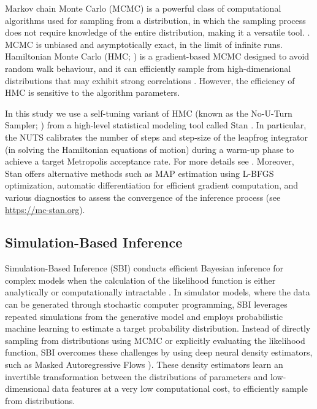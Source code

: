 \documentclass[preprint,11pt,authoryear]{elsarticle}
\begin{document}
Markov chain Monte Carlo (MCMC) is a powerful class of computational algorithms used for sampling from a distribution, in which the sampling process does not require knowledge of the entire distribution, making it a versatile tool. \citep{Andrieu2003, Murphy2022, Mcelreath2020}. MCMC is unbiased and asymptotically exact, in the limit of infinite runs. Hamiltonian Monte Carlo (HMC; \cite{Duane1987, Neal2010}) is a gradient-based MCMC designed to avoid random walk behaviour, and it can efficiently sample from high-dimensional distributions that may exhibit strong correlations \citep{Betancourt2017}. However, the efficiency of HMC is sensitive to the algorithm parameters. 

In this study we use a self-tuning variant of HMC (known as the No-U-Turn Sampler; \citep{Hoffman2014}) from a high-level statistical modeling tool called Stan \citep{Carpenter2017}.
In particular, the NUTS calibrates the number of steps and step-size of the leapfrog integrator (in solving the Hamiltonian equations of motion) during a warm-up phase to achieve a target Metropolis acceptance rate. For more details see \cite{Betancourt2013, Baldy2023}. Moreover, Stan offers alternative methods such as MAP estimation using L-BFGS optimization, automatic differentiation for efficient gradient computation, and various diagnostics to assess the convergence of the inference process (see \url{https://mc-stan.org}). 



\subsection{Simulation-Based Inference}

Simulation-Based Inference (SBI) conducts efficient Bayesian inference for complex models when the calculation of the likelihood function is either analytically or computationally intractable \citep{Cranmer2020, Brehmer2021}.
In simulator models, where the data can be generated through stochastic computer programming, SBI leverages repeated simulations from the generative model and employs probabilistic machine learning to estimate a target probability distribution. Instead of directly sampling from distributions using MCMC or explicitly evaluating the likelihood function, SBI overcomes these challenges by using deep neural density estimators, such as Masked Autoregressive Flows \citep{Papamakarios2017}).  These density estimators learn an invertible transformation between the distributions of parameters and low-dimensional data features at a very low computational cost, to efficiently sample from distributions. 
\end{document}
